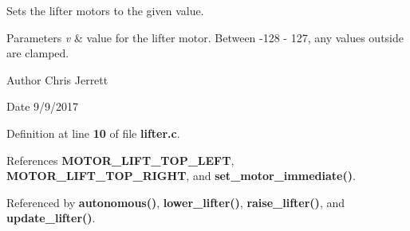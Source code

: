 Sets the lifter motors to the given value. 


\begin{DoxyParams}{Parameters}
{\em v} & value for the lifter motor. Between -\/128 -\/ 127, any values outside are clamped. \\
\hline
\end{DoxyParams}
\begin{DoxyAuthor}{Author}
Chris Jerrett 
\end{DoxyAuthor}
\begin{DoxyDate}{Date}
9/9/2017 
\end{DoxyDate}


Definition at line \textbf{ 10} of file \textbf{ lifter.\+c}.



References \textbf{ M\+O\+T\+O\+R\+\_\+\+L\+I\+F\+T\+\_\+\+T\+O\+P\+\_\+\+L\+E\+FT}, \textbf{ M\+O\+T\+O\+R\+\_\+\+L\+I\+F\+T\+\_\+\+T\+O\+P\+\_\+\+R\+I\+G\+HT}, and \textbf{ set\+\_\+motor\+\_\+immediate()}.



Referenced by \textbf{ autonomous()}, \textbf{ lower\+\_\+lifter()}, \textbf{ raise\+\_\+lifter()}, and \textbf{ update\+\_\+lifter()}.


